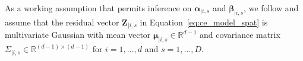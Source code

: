 \documentclass[12pt,compact]{article}
\DeclareMathOperator{\CE}{\mathrm{CE}}
\begin{document}
As a working assumption that permits inference on $\symbf{\alpha}_{\mid i, s}$ and $\symbf{\beta}_{\mid i, s}$, we follow \citet{Heffernan2004} and assume that the residual vector $\symbf{Z}_{\mid i, s}$ in Equation~\eqref{eq:ce_model_spat} is multivariate Gaussian with mean vector $\symbf{\mu}_{\mid i, s} \in\mathbb{R}^{d-1}$ and covariance matrix $\Sigma_{\mid i, s}\in\mathbb{R}^{(d-1)\times(d-1)}$ for $i = 1, \ldots, d$ and $s = 1, \ldots, D$.
\end{document}
